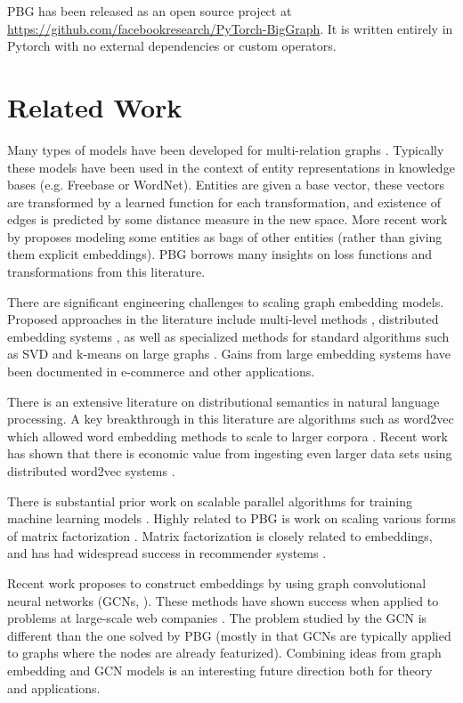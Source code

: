 \documentclass{article}
\begin{document}
PBG has been released as an open source project at \url{https://github.com/facebookresearch/PyTorch-BigGraph}. It is written entirely in Pytorch \cite{paszke2017automatic} with no external dependencies or custom operators.

\section{Related Work}
Many types of models have been developed for multi-relation graphs \cite{bordes2011learning,transE,nickel2011three,trouillon2016complex}. Typically these models  have been used in the context of entity representations in knowledge bases (e.g. Freebase or WordNet). Entities are given a base vector, these vectors are transformed by a learned function for each transformation, and existence of edges is predicted by some distance measure in the new space. More recent work by \citeauthor{wu2017starspace} proposes modeling some entities as bags of other entities (rather than giving them explicit embeddings). PBG borrows many insights on loss functions and transformations from this literature.

There are significant engineering challenges to scaling graph embedding models. Proposed approaches in the literature include multi-level methods \cite{liang2018mile}, distributed embedding systems \cite{gridword2vec, Swivel2016}, as well as specialized methods for standard algorithms such as SVD and k-means on large graphs \cite{ching2015one}. Gains from large embedding systems have been documented in e-commerce \cite{wang2018billion} and other applications. 

There is an extensive literature on distributional semantics in natural language processing. A key breakthrough in this literature are algorithms such as word2vec which allowed word embedding methods to scale to larger corpora \cite{mikolov2013efficient}. Recent work has shown that there is economic value from ingesting even larger data sets using distributed word2vec systems \cite{gridword2vec}. 

There is substantial prior work on scalable parallel algorithms for training machine learning models \cite{Dean2012}. Highly related to PBG is work on scaling various forms of matrix factorization \cite{gupta1997highly,Gemulla:2011:LMF:2020408.2020426}. Matrix factorization is closely related to embeddings, and has had widespread success in recommender systems \cite{koren2009matrix}.

Recent work proposes to construct embeddings by using graph convolutional neural networks (GCNs, \citealt{kipf2016semi}). These methods have shown success when applied to problems at large-scale web companies \cite{hamilton2017inductive,ying2018graph}. The problem studied by the GCN is different than the one solved by PBG (mostly in that GCNs are typically applied to graphs where the nodes are already featurized). Combining ideas from graph embedding and GCN models is an interesting future direction both for theory and applications.
\end{document}
